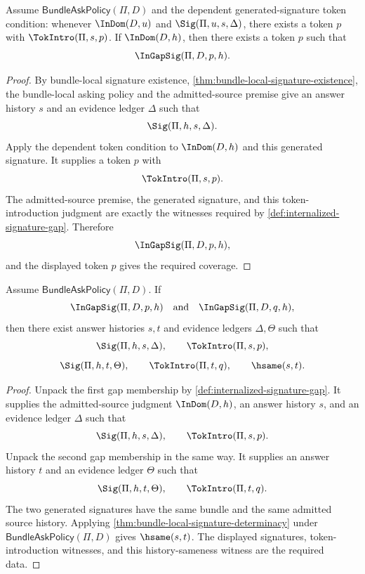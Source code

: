 \begin{theorem}
\label{thm:bundle-local-internalized-gap-coverage}
Assume $\mathsf{BundleAskPolicy}(\Pi,D)$ and the dependent generated-signature token condition: whenever $\InDom(D,u)$ and $\Sig(\Pi,u,s,\Delta)$, there exists a token $p$ with $\TokIntro(\Pi,s,p)$. If $\InDom(D,h)$, then there exists a token $p$ such that
$$
  \InGapSig(\Pi,D,p,h).
$$
\end{theorem}

\begin{proof}
By bundle-local signature existence, \autoref{thm:bundle-local-signature-existence}, the bundle-local asking policy and the admitted-source premise give an answer history $s$ and an evidence ledger $\Delta$ such that
$$
  \Sig(\Pi,h,s,\Delta).
$$
Apply the dependent token condition to $\InDom(D,h)$ and this generated signature. It supplies a token $p$ with
$$
  \TokIntro(\Pi,s,p).
$$
The admitted-source premise, the generated signature, and this token-introduction judgment are exactly the witnesses required by \autoref{def:internalized-signature-gap}. Therefore
$$
  \InGapSig(\Pi,D,p,h),
$$
and the displayed token $p$ gives the required coverage.
\end{proof}

\begin{theorem}
\label{thm:bundle-local-gap-memberships-share-signature}
Assume $\mathsf{BundleAskPolicy}(\Pi,D)$. If
$$
  \InGapSig(\Pi,D,p,h)
  \quad\text{and}\quad
  \InGapSig(\Pi,D,q,h),
$$
then there exist answer histories $s,t$ and evidence ledgers $\Delta,\Theta$ such that
$$
  \Sig(\Pi,h,s,\Delta),
  \qquad
  \TokIntro(\Pi,s,p),
$$
$$
  \Sig(\Pi,h,t,\Theta),
  \qquad
  \TokIntro(\Pi,t,q),
  \qquad
  \hsame(s,t).
$$
\end{theorem}

\begin{proof}
Unpack the first gap membership by \autoref{def:internalized-signature-gap}. It supplies the admitted-source judgment $\InDom(D,h)$, an answer history $s$, and an evidence ledger $\Delta$ such that
$$
  \Sig(\Pi,h,s,\Delta),
  \qquad
  \TokIntro(\Pi,s,p).
$$
Unpack the second gap membership in the same way. It supplies an answer history $t$ and an evidence ledger $\Theta$ such that
$$
  \Sig(\Pi,h,t,\Theta),
  \qquad
  \TokIntro(\Pi,t,q).
$$
The two generated signatures have the same bundle and the same admitted source history. Applying \autoref{thm:bundle-local-signature-determinacy} under $\mathsf{BundleAskPolicy}(\Pi,D)$ gives $\hsame(s,t)$. The displayed signatures, token-introduction witnesses, and this history-sameness witness are the required data.
\end{proof}
